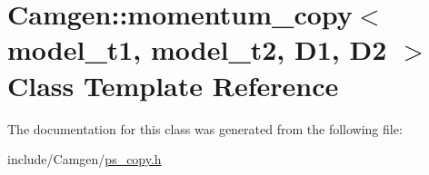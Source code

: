 \hypertarget{a00374}{\section{Camgen\-:\-:momentum\-\_\-copy$<$ model\-\_\-t1, model\-\_\-t2, D1, D2 $>$ Class Template Reference}
\label{a00374}
}


The documentation for this class was generated from the following file\-:\begin{DoxyCompactItemize}
\item 
include/\-Camgen/\hyperlink{a00712}{ps\-\_\-copy.\-h}\end{DoxyCompactItemize}
